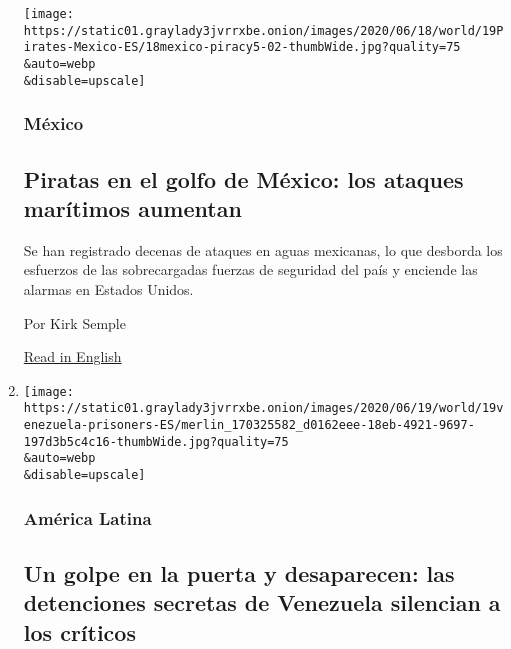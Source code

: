 \begin{enumerate}
  \texttt{[image: https://static01.graylady3jvrrxbe.onion/images/2020/06/18/world/19Pirates-Mexico-ES/18mexico-piracy5-02-thumbWide.jpg?quality=75\\\&auto=webp\\\&disable=upscale]}

  \hypertarget{muxe9xico-1}{%
  \subsubsection{México}\label{muxe9xico-1}}

  \hypertarget{piratas-en-el-golfo-de-muxe9xico-los-ataques-maruxedtimos-aumentan}{%
  \subsection{Piratas en el golfo de México: los ataques marítimos
  aumentan}\label{piratas-en-el-golfo-de-muxe9xico-los-ataques-maruxedtimos-aumentan}}

  Se han registrado decenas de ataques en aguas mexicanas, lo que
  desborda los esfuerzos de las sobrecargadas fuerzas de seguridad del
  país y enciende las alarmas en Estados Unidos.

  Por Kirk Semple

  \href{https://www.nytimes3xbfgragh.onion/2020/06/18/world/americas/gulf-mexico-pirates-ships.html}{Read
  in English}
\item
  \href{/es/2020/06/19/espanol/america-latina/desapariciones-forzadas-venezuela-informe-maduro.html}{}

  \texttt{[image: https://static01.graylady3jvrrxbe.onion/images/2020/06/19/world/19venezuela-prisoners-ES/merlin\_170325582\_d0162eee-18eb-4921-9697-197d3b5c4c16-thumbWide.jpg?quality=75\\\&auto=webp\\\&disable=upscale]}

  \hypertarget{amuxe9rica-latina-4}{%
  \subsubsection{América Latina}\label{amuxe9rica-latina-4}}

  \hypertarget{un-golpe-en-la-puerta-y-desaparecen-las-detenciones-secretas-de-venezuela-silencian-a-los-cruxedticos}{%
  \subsection{Un golpe en la puerta y desaparecen: las detenciones
  secretas de Venezuela silencian a los
  críticos}\label{un-golpe-en-la-puerta-y-desaparecen-las-detenciones-secretas-de-venezuela-silencian-a-los-cruxedticos}}


\end{enumerate}

